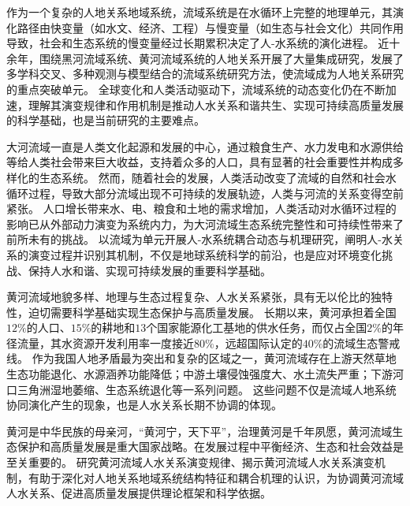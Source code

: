作为一个复杂的人地关系地域系统，流域系统是在水循环上完整的地理单元，其演化路径由快变量（如水文、经济、工程）与慢变量（如生态与社会文化）共同作用导致，社会和生态系统的慢变量经过长期累积决定了人-水系统的演化进程\cite{falkenmark2021}。
近十余年，围绕黑河流域系统、黄河流域系统的人地关系开展了大量集成研究，发展了多学科交叉、多种观测与模型结合的流域系统研究方法，使流域成为人地关系研究的重点突破单元\cite{cheng2014, fu2021a}。
全球变化和人类活动驱动下，流域系统的动态变化仍在不断加速，理解其演变规律和作用机制是推动人水关系和谐共生、实现可持续高质量发展的科学基础，也是当前研究的主要难点\cite{reyers2018}。

大河流域一直是人类文化起源和发展的中心，通过粮食生产、水力发电和水源供给等给人类社会带来巨大收益，支持着众多的人口，具有显著的社会重要性并构成多样化的生态系统\cite{best2019}。
然而，随着社会的发展，人类活动改变了流域的自然和社会水循环过程，导致大部分流域出现不可持续的发展轨迹，人类与河流的关系变得空前紧张\cite{best2019, best2020}。
人口增长带来水、电、粮食和土地的需求增加，人类活动对水循环过程的影响已从外部动力演变为系统内力，为大河流域生态系统完整性和可持续性带来了前所未有的挑战\cite{crutzen2006, dibaldassarre2019}。
以流域为单元开展人-水系统耦合动态与机理研究，阐明人-水关系的演变过程并识别其机制，不仅是地球系统科学的前沿，也是应对环境变化挑战、保持人水和谐、实现可持续发展的重要科学基础。


黄河流域地貌多样、地理与生态过程复杂、人水关系紧张，具有无以伦比的独特性，迫切需要科学基础实现生态保护与高质量发展。
长期以来，黄河承担着全国$12\%$的人口、$15\%$的耕地和$13$个国家能源化工基地的供水任务，而仅占全国$2\%$的年径流量，其水资源开发利用率一度接近$80\%$，远超国际认定的$40\%$的流域生态警戒线\cite{fu2021a}。
作为我国人地矛盾最为突出和复杂的区域之一，黄河流域存在上游天然草地生态功能退化、水源涵养功能降低；中游土壤侵蚀强度大、水土流失严重；下游河口三角洲湿地萎缩、生态系统退化等一系列问题\cite{mazhuguo2020}。
这些问题不仅是流域人地系统协同演化产生的现象，也是人水关系长期不协调的体现\cite{fu2021a}。

黄河是中华民族的母亲河，“黄河宁，天下平”，治理黄河是千年夙愿，黄河流域生态保护和高质量发展是重大国家战略。在发展过程中平衡经济、生态和社会效益是至关重要的。
研究黄河流域人水关系演变规律、揭示黄河流域人水关系演变机制，有助于深化对人地关系地域系统结构特征和耦合机理的认识，为协调黄河流域人水关系、促进高质量发展提供理论框架和科学依据。
